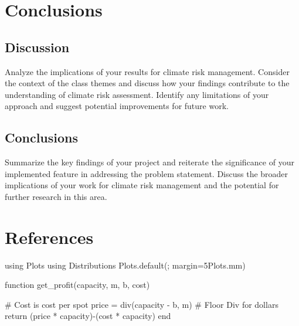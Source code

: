 \documentclass[
  11pt,
]{article}
\newenvironment{Shaded}{\begin{snugshade}}{\end{snugshade}}
\newcommand{\BuiltInTok}[1]{\textcolor[rgb]{0.00,0.23,0.31}{#1}}
\newcommand{\CommentTok}[1]{\textcolor[rgb]{0.37,0.37,0.37}{#1}}
\newcommand{\ControlFlowTok}[1]{\textcolor[rgb]{0.00,0.23,0.31}{#1}}
\newcommand{\FloatTok}[1]{\textcolor[rgb]{0.68,0.00,0.00}{#1}}
\newcommand{\FunctionTok}[1]{\textcolor[rgb]{0.28,0.35,0.67}{#1}}
\newcommand{\ImportTok}[1]{\textcolor[rgb]{0.00,0.46,0.62}{#1}}
\newcommand{\KeywordTok}[1]{\textcolor[rgb]{0.00,0.23,0.31}{#1}}
\newcommand{\NormalTok}[1]{\textcolor[rgb]{0.00,0.23,0.31}{#1}}
\newcommand{\OperatorTok}[1]{\textcolor[rgb]{0.37,0.37,0.37}{#1}}
\newlength{\cslhangindent}
\newenvironment{CSLReferences}[2] %
 {\begin{list}{}{%
  \setlength{\itemindent}{0pt}
  \setlength{\leftmargin}{0pt}
  \setlength{\parsep}{0pt}
  \ifodd #1
   \setlength{\leftmargin}{\cslhangindent}
   \setlength{\itemindent}{-1\cslhangindent}
  \fi
  \setlength{\itemsep}{#2\baselineskip}}}
 {\end{list}}
\begin{document}
\section{Conclusions}\label{conclusions}

\subsection{Discussion}\label{discussion}

Analyze the implications of your results for climate risk management.
Consider the context of the class themes and discuss how your findings
contribute to the understanding of climate risk assessment. Identify any
limitations of your approach and suggest potential improvements for
future work.

\subsection{Conclusions}\label{conclusions-1}

Summarize the key findings of your project and reiterate the
significance of your implemented feature in addressing the problem
statement. Discuss the broader implications of your work for climate
risk management and the potential for further research in this area.

\section{References}\label{references}

\label{refs}
\begin{CSLReferences}{0}{1}
\end{CSLReferences}

\begin{Shaded}
\begin{Highlighting}[numbers=left,,]
\ImportTok{using} \BuiltInTok{Plots}
\ImportTok{using} \BuiltInTok{Distributions}
\NormalTok{Plots.}\FunctionTok{default}\NormalTok{(; margin}\OperatorTok{=}\FloatTok{5}\NormalTok{Plots.mm)}
\end{Highlighting}
\end{Shaded}

\begin{Shaded}
\begin{Highlighting}[numbers=left,,]
\KeywordTok{function} \FunctionTok{get\_profit}\NormalTok{(capacity, m, b, cost)}

    \CommentTok{\# Cost is cost per spot }
\NormalTok{    price }\OperatorTok{=} \FunctionTok{div}\NormalTok{(capacity }\OperatorTok{{-}}\NormalTok{ b, m) }\CommentTok{\# Floor Div for dollars}
    \ControlFlowTok{return}\NormalTok{ (price }\OperatorTok{*}\NormalTok{ capacity)}\FunctionTok{{-}}\NormalTok{(cost }\OperatorTok{*}\NormalTok{ capacity)}
\KeywordTok{end}
\end{Highlighting}
\end{Shaded}
\end{document}
